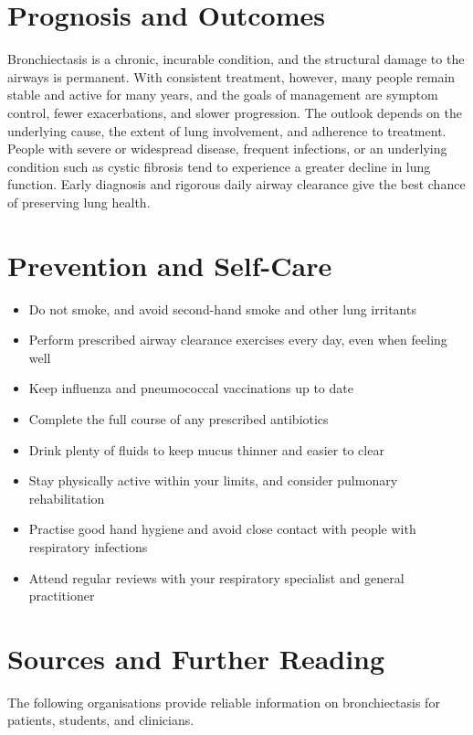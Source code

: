 \section*{Prognosis and Outcomes}
Bronchiectasis is a chronic, incurable condition, and the structural damage to the airways is permanent. With consistent treatment, however, many people remain stable and active for many years, and the goals of management are symptom control, fewer exacerbations, and slower progression. The outlook depends on the underlying cause, the extent of lung involvement, and adherence to treatment. People with severe or widespread disease, frequent infections, or an underlying condition such as cystic fibrosis tend to experience a greater decline in lung function. Early diagnosis and rigorous daily airway clearance give the best chance of preserving lung health.

\section*{Prevention and Self-Care}
\begin{itemize}
    \item Do not smoke, and avoid second-hand smoke and other lung irritants
    \item Perform prescribed airway clearance exercises every day, even when feeling well
    \item Keep influenza and pneumococcal vaccinations up to date
    \item Complete the full course of any prescribed antibiotics
    \item Drink plenty of fluids to keep mucus thinner and easier to clear
    \item Stay physically active within your limits, and consider pulmonary rehabilitation
    \item Practise good hand hygiene and avoid close contact with people with respiratory infections
    \item Attend regular reviews with your respiratory specialist and general practitioner
\end{itemize}

\section*{Sources and Further Reading}
The following organisations provide reliable information on bronchiectasis for patients, students, and clinicians.

